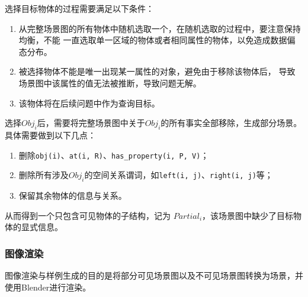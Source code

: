 \begin{enumerate}[nosep]
选择目标物体的过程需要满足以下条件：
\begin{enumerate}[nosep]
\item 从完整场景图的所有物体中随机选取一个，在随机选取的过程中，要注意保持均衡，不能
一直选取单一区域的物体或者相同属性的物体，以免造成数据偏态分布。
\item 被选择物体不能是唯一出现某一属性的对象，避免由于移除该物体后，
导致场景图中该属性的值无法被推断，导致问题无解。
\item 该物体将在后续问题中作为查询目标。
\end{enumerate}

选择$Obj_i$后，需要将完整场景图中关于$Obj_i$的所有事实全部移除，生成部分场景。具体需要做到以下几点：
\begin{enumerate}[nosep]
\item 删除\texttt{obj(i)}、\texttt{at(i, R)}、\texttt{has\_property(i, P, V)}；
\item 删除所有涉及$Obj_i$的空间关系谓词，如\texttt{left(i, j)}、\texttt{right(i, j)}等；
\item 保留其余物体的信息与关系。
\end{enumerate}
从而得到一个只包含可见物体的子结构，记为 $Partial_i$，该场景图中缺少了目标物体的显式信息。
\end{enumerate}
\subsubsection{图像渲染}
图像渲染与样例生成的目的是将部分可见场景图以及不可见场景图转换为场景，并使用Blender进行渲染。

